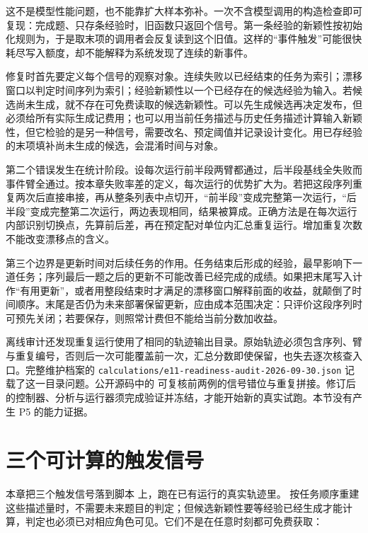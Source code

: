这不是模型性能问题，也不能靠扩大样本弥补。一次不含模型调用的构造检查即可复现：完成题、只存条经验时，旧函数只返回个信号。第一条经验的新颖性按初始化规则为，于是取末项的调用者会反复读到这个旧值。这样的“事件触发”可能很快耗尽写入额度，却不能解释为系统发现了连续的新事件。

修复时首先要定义每个信号的观察对象。连续失败以已经结束的任务为索引；漂移窗口以判定时间序列为索引；经验新颖性以一个已经存在的候选经验为输入。若候选尚未生成，就不存在可免费读取的候选新颖性。可以先生成候选再决定发布，但必须给所有实际生成记费用；也可以用当前任务描述与历史任务描述计算输入新颖性，但它检验的是另一种信号，需要改名、预定阈值并记录设计变化。用已存经验的末项填补尚未生成的候选，会混淆时间与对象。

第二个错误发生在统计阶段。设每次运行前半段两臂都通过，后半段基线全失败而事件臂全通过。按本章失败率差的定义，每次运行的优势扩大为。若把这段序列重复两次后直接串接，再从整条列表中点切开，“前半段”变成完整第一次运行，“后半段”变成完整第二次运行，两边表现相同，结果被算成。正确方法是在每次运行内部识别切换点，先算前后差，再在预定配对单位内汇总重复运行。增加重复次数不能改变漂移点的含义。

第三个边界是更新时间对后续任务的作用。任务结束后形成的经验，最早影响下一道任务；序列最后一题之后的更新不可能改善已经完成的成绩。如果把末尾写入计作“有用更新”，或者用整段结束时才满足的漂移窗口解释前面的收益，就颠倒了时间顺序。末尾是否仍为未来部署保留更新，应由成本范围决定：只评价这段序列时可预先关闭；若要保存，则照常计费但不能给当前分数加收益。

离线审计还发现重复运行使用了相同的轨迹输出目录。原始轨迹必须包含序列、臂与重复编号，否则后一次可能覆盖前一次，汇总分数即使保留，也失去逐次核查入口。完整维护档案的 \nolinkurl{calculations/e11-readiness-audit-2026-09-30.json} 记载了这一目录问题。公开源码中的  可复核前两例的信号错位与重复拼接。修订后的控制器、分析与运行器须完成验证并冻结，才能开始新的真实试跑。本节没有产生 P5 的能力证据。

\section{三个可计算的触发信号}
\label{sec:ch13-signals}

本章把三个触发信号落到脚本
 上，跑在已有运行的真实轨迹里。
按任务顺序重建这些描述量时，不需要未来题目的判定；但候选新颖性要等经验已经生成才能计算，判定也必须已对相应角色可见。它们不是在任意时刻都可免费获取：

